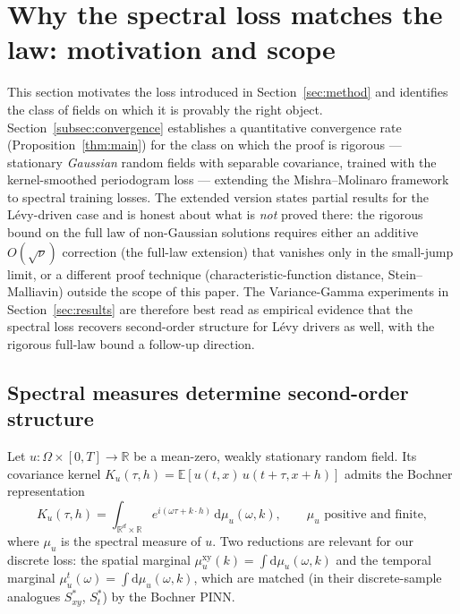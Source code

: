 \documentclass[10pt]{elsarticle}
\begin{document}
\section{Why the spectral loss matches the law: motivation and scope}
\label{sec:theory}

This section motivates the loss introduced in Section~\ref{sec:method}
and identifies the class of fields on which it is provably the right
object. Section~\ref{subsec:convergence} establishes a quantitative
convergence rate (Proposition~\ref{thm:main}) for the class on which the
proof is rigorous --- stationary \emph{Gaussian} random fields with
separable covariance, trained with the kernel-smoothed periodogram
loss --- extending the Mishra--Molinaro
framework~\cite{MishraMolinaro2022,DeRyckMishra2022} to spectral
training losses. The extended version states partial
results for the L\'evy-driven case and is honest about what is
\emph{not} proved there: the rigorous bound on the full law of
non-Gaussian solutions requires either an additive $O(\sqrt{\nu})$
correction (the full-law extension) that vanishes only in the
small-jump limit, or a different proof technique
(characteristic-function distance, Stein--Malliavin) outside the
scope of this paper. The Variance-Gamma experiments in
Section~\ref{sec:results} are therefore best read as empirical
evidence that the spectral loss recovers second-order structure for
L\'evy drivers as well, with the rigorous full-law bound a
follow-up direction.

\subsection{Spectral measures determine second-order structure}

Let \(u : \Omega \times [0, T] \to \mathbb R\) be a mean-zero,
weakly stationary random field. Its covariance kernel
\(K_u(\tau, h) = \mathbb E[u(t,x)\,u(t+\tau, x+h)]\) admits the
Bochner representation~\cite[Thm.~9.18]{RudinRCA}
\begin{equation}
K_u(\tau, h) = \int_{\mathbb R^d \times \mathbb R}
e^{i(\omega \tau + k \cdot h)}\,\mathrm d\mu_u(\omega, k),
\qquad \mu_u\text{ positive and finite},
\label{eq:bochner}
\end{equation}
where \(\mu_u\) is the spectral measure of \(u\). Two reductions
are relevant for our discrete loss: the spatial marginal
\(\mu^{\mathrm{xy}}_u(k) = \int \mathrm d \mu_u(\omega, k)\) and
the temporal marginal
\(\mu^t_u(\omega) = \int \mathrm d \mu_u(\omega, k)\), which are
matched (in their discrete-sample analogues \(S^*_{xy}\),
\(S^*_t\)) by the Bochner PINN.
\end{document}

